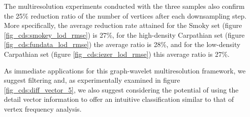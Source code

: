 \documentclass[graybox]{svmult}
\begin{document}
	The multiresolution experiments conducted with the three samples also confirm the 25\% reduction ratio of the number of vertices after each downsampling step. More specifically, the average reduction rate attained for the Smoky set (figure \ref{fig_cds:smokey_lod_rmse}) is 27\%, for the high-density Carpathian set (figure \ref{fig_cds:fundata_lod_rmse}) the average ratio is 28\%, and for the low-density Carpathian set (figure \ref{fig_cds:iezer_lod_rmse})  this average ratio is 27\%.
	
	As immediate applications for this graph-wavelet multiresolution framework, we suggest filtering \cite{CDS2017} and, as experimentally examined in figure \ref{fig_cds:diff_vector_5}, we also suggest considering the potential of using the detail vector information to offer an intuitive classification similar to that of vertex frequency analysis.
	
	
	
	
	
	
	
	
		
	
	
\end{document}
